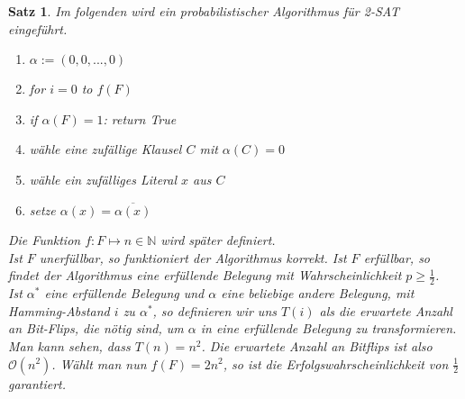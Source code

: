 \documentclass[a4paper, 12pt]{article}
\theoremstyle{plain}
\newtheorem{theorem}{Satz}[section] %
\theoremstyle{definition}
\theoremstyle{lemma}
\theoremstyle{remark}
\theoremstyle{corollary}
\theoremstyle{example}
\begin{document}
	\begin{theorem}
		Im folgenden wird ein probabilistischer Algorithmus für 2-SAT eingeführt.
		\begin{enumerate}
			\item $\alpha := (0,0,...,0)$
			\item for $i = 0$ to $f(F)$
			\item if $\alpha(F) = 1$: return True
			\item wähle eine zufällige Klausel $C$ mit $\alpha(C) = 0$
			\item wähle ein zufälliges Literal $x$ aus $C$
			\item setze $\alpha(x) = \overline{\alpha(x)}$
		\end{enumerate}
		Die Funktion $f: F \mapsto n \in \mathbb{N}$ wird später definiert.\\
		Ist $F$ unerfüllbar, so funktioniert der Algorithmus korrekt. Ist $F$ erfüllbar, so findet der Algorithmus eine erfüllende Belegung mit Wahrscheinlichkeit $p \geq \frac{1}{2}$.\\
		Ist $\alpha^*$ eine erfüllende Belegung und $\alpha$ eine beliebige andere Belegung, mit Hamming-Abstand $i$ zu $\alpha^*$, so definieren wir uns $T(i)$ als die erwartete Anzahl an Bit-Flips, die nötig sind, um $\alpha$ in eine erfüllende Belegung zu transformieren. Man kann sehen, dass $T(n) = n^2$. Die erwartete Anzahl an Bitflips ist also $\mathcal{O}(n^2)$. Wählt man nun $f(F) = 2n^2$, so ist die Erfolgswahrscheinlichkeit von $\frac{1}{2}$ garantiert.
	\end{theorem}
\end{document}
